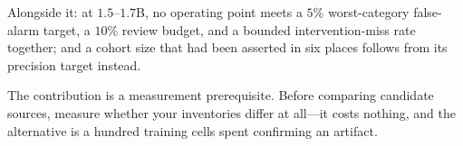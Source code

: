 \documentclass[10pt]{article}
\begin{document}
Alongside it: at $1.5$--$1.7$B, no operating point meets a $5\%$ worst-category
false-alarm target, a $10\%$ review budget, and a bounded intervention-miss rate
together; and a cohort size that had been asserted in six places follows from its
precision target instead.

The contribution is a measurement prerequisite. Before comparing candidate sources,
measure whether your inventories differ at all---it costs nothing, and the alternative
is a hundred training cells spent confirming an artifact.



\end{document}
